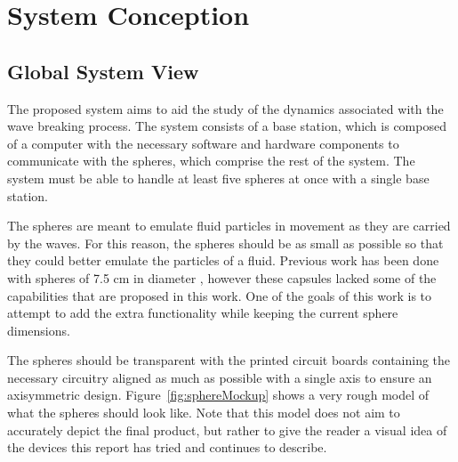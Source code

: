 \section{System Conception}



\subsection{Global System View}
The proposed system aims to aid the study of the dynamics associated with the wave breaking process.  The system consists of a base station, which is composed of a computer with the necessary software and hardware components to communicate with the spheres, which comprise the rest of the system.  The system must be able to handle at least five spheres at once with a single base station.

The spheres are meant to emulate fluid particles in movement as they are carried by the waves.  For this reason, the spheres should be as small as possible so that they could better emulate the particles of a fluid.  Previous work has been done with spheres of 7.5 cm in diameter \cite{Canals2012}, however these capsules lacked some of the capabilities that are proposed in this work.  One of the goals of this work is to attempt to add the extra functionality while keeping the current sphere dimensions.

The spheres should be transparent with the printed circuit boards containing the necessary circuitry aligned as much as possible with a single axis to ensure an axisymmetric design.  Figure~\ref{fig:sphereMockup} shows a very rough model of what the spheres should look like.  Note that this model does not aim to accurately depict the final product, but rather to give the reader a visual idea of the devices this report has tried and continues to describe.  


